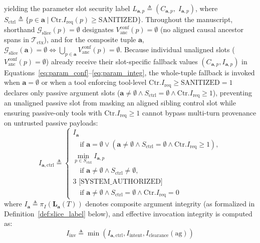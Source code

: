 \documentclass[conference,10pt]{IEEEtran}
\begin{document}
yielding the parameter slot security label $L_{\mathbf{a}, p} \triangleq (C_{\mathbf{a}, p}, \; I_{\mathbf{a}, p})$, where $S_{\text{ctrl}} \triangleq \{p \in \mathbf{a} \mid \text{Ctr}.I_{\text{req}}(p) \ge \text{SANITIZED}\}$. Throughout the manuscript, shorthand $\mathcal{G}_{\text{slice}}(p) = \emptyset$ designates $V_{\text{anc}}^{\text{conf}}(p) = \emptyset$ (no aligned causal ancestor spans in $\mathcal{T}_{\text{ctx}}$), and for the composite tuple $\mathbf{a}$, $\mathcal{G}_{\text{slice}}(\mathbf{a}) = \emptyset \iff \bigcup_{p \in \mathbf{a}} V_{\text{anc}}^{\text{conf}}(p) = \emptyset$. Because individual unaligned slots ($V_{\text{anc}}^{\text{conf}}(p) = \emptyset$) already receive their slot-specific fallback values $(C_{\mathbf{a}, p}, I_{\mathbf{a}, p})$ in Equations~\eqref{eq:param_conf}--\eqref{eq:param_integ}, the whole-tuple fallback is invoked when $\mathbf{a} = \emptyset$ or when a tool enforcing tool-level $\text{Ctr}.I_{\text{req}} \ge \text{SANITIZED} = 1$ declares only passive argument slots ($\mathbf{a} \ne \emptyset \land S_{\text{ctrl}} = \emptyset \land \text{Ctr}.I_{\text{req}} \ge 1$), preventing an unaligned passive slot from masking an aligned sibling control slot while ensuring passive-only tools with $\text{Ctr}.I_{\text{req}} \ge 1$ cannot bypass multi-turn provenance on untrusted passive payloads:
\begin{equation}
I_{\mathbf{a}, \text{ctrl}} \triangleq \begin{cases}
I_{\mathbf{a}} \\
\quad \text{if } \mathbf{a} = \emptyset \lor (\mathbf{a} \ne \emptyset \land S_{\text{ctrl}} = \emptyset \land \text{Ctr}.I_{\text{req}} \ge 1), \\
\min_{p \in S_{\text{ctrl}}} I_{\mathbf{a}, p} \\
\quad \text{if } \mathbf{a} \ne \emptyset \land S_{\text{ctrl}} \ne \emptyset, \\
3 \text{ [SYSTEM\_AUTHORIZED]} \\
\quad \text{if } \mathbf{a} \ne \emptyset \land S_{\text{ctrl}} = \emptyset \land \text{Ctr}.I_{\text{req}} = 0
\end{cases}
\end{equation}
where $I_{\mathbf{a}} \triangleq \pi_I(\mathbf{L}_{\mathbf{a}}(T))$ denotes composite argument integrity (as formalized in Definition~\ref{def:slice_label} below), and effective invocation integrity is computed as:
\begin{equation}
\label{eq:inv_integ}
I_{\text{inv}} \triangleq \min(I_{\mathbf{a}, \text{ctrl}}, I_{\text{intent}}, I_{\text{clearance}}(\text{ag}))
\end{equation}
\end{document}
